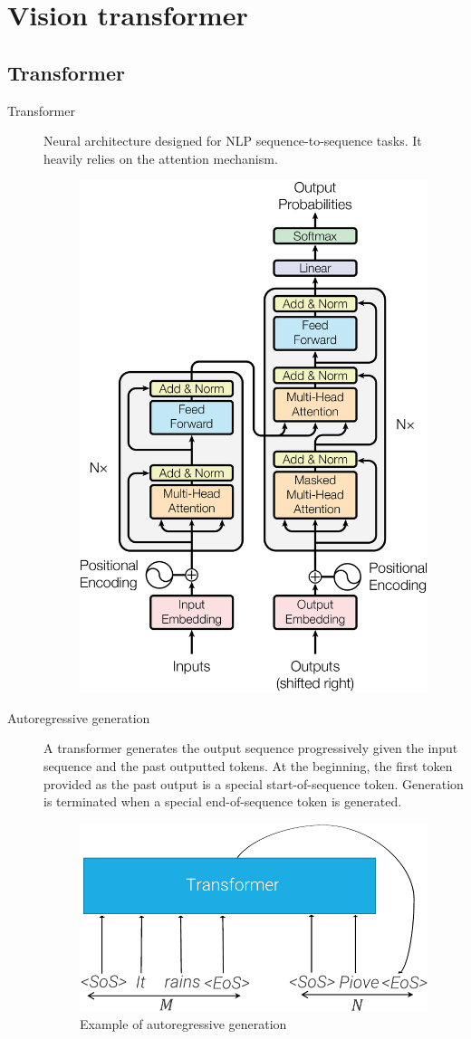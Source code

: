 \chapter{Vision transformer}



\section{Transformer}

\begin{description}
    \item[Transformer] 
        Neural architecture designed for NLP sequence-to-sequence tasks. It heavily relies on the attention mechanism.
        \begin{figure}[H]
            \centering
            \includegraphics[width=0.4\linewidth]{./img/transformer.png}
        \end{figure}

    \item[Autoregressive generation] 
        A transformer generates the output sequence progressively given the input sequence and the past outputted tokens. At the beginning, the first token provided as the past output is a special start-of-sequence token. Generation is terminated when a special end-of-sequence token is generated.

        \begin{figure}[H]
            \centering
            \includegraphics[width=0.3\linewidth]{./img/_transformer_autoregressive.pdf}
            \caption{Example of autoregressive generation}
        \end{figure}
\end{description}


